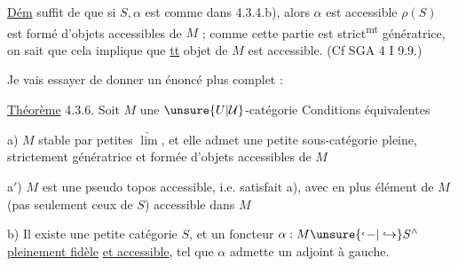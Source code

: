 
\uline{Dém}  suffit de   que si $S,\alpha$ est comme dans 4.3.4.b), alors $\alpha$ est accessible   $\rho(S)$  est formé d'objets accessibles de $M$ ; comme cette partie est strict\textsuperscript{mt} génératrice, on sait que cela implique que \uline{tt} objet de $M$ est accessible. (Cf SGA 4 I 9.9.)


Je vais essayer de donner un énoncé plus complet :

\uline{Théorème} 4.3.6. Soit $M$ une $\unsure{U|\mathcal U}$-catégorie Conditions équivalentes

a) $M$ stable par petites $\underrightarrow{\lim}$, et elle admet une petite sous-catégorie pleine,  strictement génératrice  et formée d'objets accessibles de $M$

a$'$) $M$ est une pseudo topos  accessible, i.e. satisfait a), avec en plus \uline{} élément de $M$ (pas seulement ceux de $S$) accessible dans $M$

b) Il existe une petite catégorie $S$, et un foncteur $\alpha:M\unsure{\lhook\joinrel-|\hookrightarrow} S^\wedge$ \uline{pleinement fidèle} \uline{et accessible}, tel que $\alpha$ admette un adjoint à gauche.

